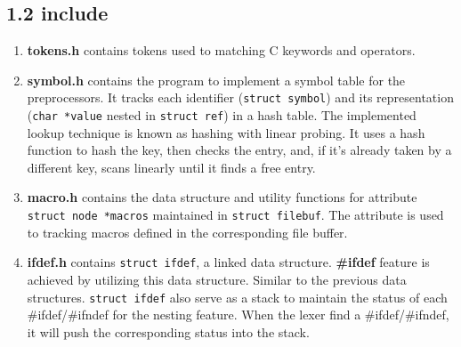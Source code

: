 \subsection*{1.2 \large\textbf{include}}
\begin{enumerate}
    \item \textbf{tokens.h} contains tokens used to matching C keywords and operators.
    \item \textbf{symbol.h} contains the program to implement a symbol table for the preprocessors. It tracks each identifier (\texttt{struct symbol}) and its representation (\texttt{char *value} nested in \texttt{struct ref}) in a hash table. The implemented lookup technique is known as hashing with linear probing. It uses a hash function to hash the key, then checks the entry, and, if it’s already taken by a different key, scans linearly until it finds a free entry.
    \item \textbf{macro.h} contains the data structure and utility functions for attribute \texttt{struct node *macros} maintained in \texttt{struct filebuf}. The attribute is used to tracking macros defined in the corresponding file buffer.
    \item \textbf{ifdef.h} contains \texttt{struct ifdef}, a linked data structure. \textbf{\#ifdef} feature is achieved by utilizing this data structure. Similar to the previous data structures. \texttt{struct ifdef} also serve as a stack to maintain the status of each \#ifdef/\#ifndef for the nesting feature. When the lexer find a \#ifdef/\#ifndef, it will push the corresponding status into the stack. 
\end{enumerate} 